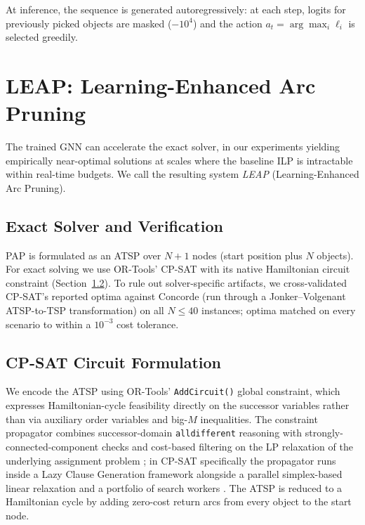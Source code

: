 \documentclass[review,times]{elsarticle}
\begin{document}
At inference, the sequence is generated autoregressively: at each step, logits for previously picked objects are masked ($-10^4$) and the action $a_t = \arg\max_i \ell_i$ is selected greedily.

\section{LEAP: Learning-Enhanced Arc Pruning}\label{sec:ilp_accel}

The trained GNN can accelerate the exact solver, in our experiments yielding empirically near-optimal solutions at scales where the baseline ILP is intractable within real-time budgets. We call the resulting system \emph{LEAP} (Learning-Enhanced Arc Pruning).

\subsection{Exact Solver and Verification}

PAP is formulated as an ATSP over $N{+}1$ nodes (start position plus $N$ objects). For exact solving we use OR-Tools' CP-SAT \cite{ortools} with its native Hamiltonian circuit constraint (Section~\ref{sec:circuit}). To rule out solver-specific artifacts, we cross-validated CP-SAT's reported optima against Concorde \cite{applegate2006concorde} (run through a Jonker--Volgenant ATSP-to-TSP transformation) on all $N\!\le\!40$ instances; optima matched on every scenario to within a $10^{-3}$ cost tolerance.

\subsection{CP-SAT Circuit Formulation}\label{sec:circuit}

We encode the ATSP using OR-Tools' \texttt{AddCircuit()} global constraint, which expresses Hamiltonian-cycle feasibility directly on the successor variables rather than via auxiliary order variables and big-$M$ inequalities. The constraint propagator combines successor-domain \texttt{alldifferent} reasoning with strongly-connected-component checks and cost-based filtering on the LP relaxation of the underlying assignment problem \cite{caseau1997circuit,francis2014explaining}; in CP-SAT specifically the propagator runs inside a Lazy Clause Generation framework alongside a parallel simplex-based linear relaxation and a portfolio of search workers \cite{perron2023cpsat}. The ATSP is reduced to a Hamiltonian cycle by adding zero-cost return arcs from every object to the start node.
\end{document}
